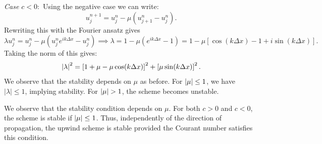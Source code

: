 \textit{Case $c<0:$} Using the negative case we can write: 
\begin{equation}
   u_j^{n+1} = u_j^n - \mu \left(u_{j+1}^n-u_j^n\right).
\end{equation}
Rewriting this with the Fourier ansatz gives
\begin{equation}
    \lambda u_j^n = u_j^n - \mu \left( u_j^ne^{ik\Delta x}-u_j^n \right) \implies \lambda = 1-\mu\left(e^{ik\Delta x}-1\right) = 1-\mu\left[\cos(k\Delta x)-1+i\sin(k\Delta x)\right].
\end{equation}
Taking the norm of this gives: 
\begin{equation*}
    \left| \lambda \right|^2 = \left[1+\mu-\mu\cos(k\Delta x)\right]^2 + \left[\mu\sin(k\Delta x)\right]^2.
\end{equation*} 
We observe that the stability depends on $\mu$ as before. For $ \left| \mu \right| \leq 1$, we have $|\lambda| \leq 1$, implying stability. For $\left| \mu \right| > 1$, the scheme becomes unstable.

\begin{answer}
We observe that the stability condition depends on $\mu$. For both $c > 0$ and $c < 0$, the scheme is stable if $ \left| \mu \right| \leq 1$.  Thus, independently of the direction of propagation, the upwind scheme is stable provided the Courant number satisfies this condition.
\end{answer}